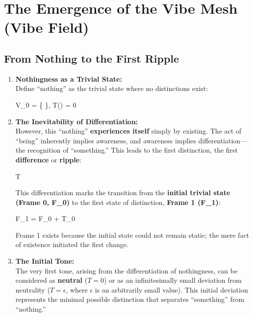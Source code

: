 \documentclass{article}
\let\oldequation\equation
\let\endoldequation\endequation
\renewenvironment{equation}{%
    \noindent\vspace{-\parskip}\vspace{-\baselineskip}%
    \oldequation
}{%
    \endoldequation
    \noindent\vspace{-\parskip}\vspace{-\baselineskip}%
}
\theoremstyle{definition}
\begin{document}
\section{The Emergence of the Vibe Mesh (Vibe Field)}

\subsection{From Nothing to the First Ripple}

\begin{enumerate}
\item \textbf{Nothingness as a Trivial State:}\\
Define \enquote{nothing} as the trivial state where no distinctions exist:

\begin{equation}
V_0 = \{ \emptyset \}, \quad T(\emptyset) = 0
\end{equation}

\item \textbf{The Inevitability of Differentiation:}\\
However, this \enquote{nothing} \textbf{experiences itself} simply by existing. The act of \enquote{being} inherently implies awareness, and awareness implies differ\-entiation---the recognition of \enquote{something.} This leads to the first distinction, the first \textbf{difference} or \textbf{ripple}:

\begin{equation}
\Delta T 
\end{equation}

This differentiation marks the transition from the \textbf{initial trivial state (Frame 0, F\_0)} to the first state of distinction, \textbf{Frame 1 (F\_1)}:

\begin{equation}
F_1 = F_0 + \Delta T_0
\end{equation}

Frame 1 exists because the initial state could not remain static; the mere fact of existence initiated the first change.

\item \textbf{The Initial Tone:}\\
The very first tone, arising from the differentiation of nothingness, can be considered as \textbf{neutral} ($T = 0$) or as an infinitesimally small deviation from neutrality ($T = \epsilon$, where $\epsilon$ is an arbitrarily small value). This initial deviation represents the minimal possible distinction that separates \enquote{something} from \enquote{nothing.}


\end{enumerate}
\end{document}

